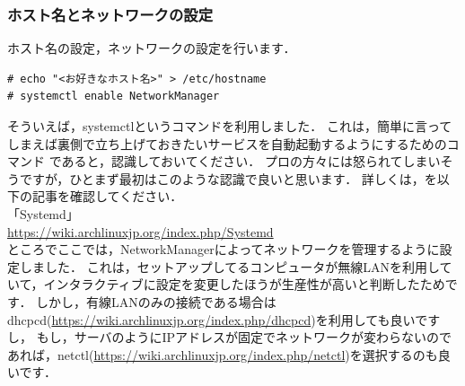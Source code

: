 \documentclass[b5j,twoside,openany]{jsbook}
\begin{document}
      \subsubsection{ホスト名とネットワークの設定}
        ホスト名の設定，ネットワークの設定を行います．
        \begin{screen}
\begin{verbatim}
# echo "<お好きなホスト名>" > /etc/hostname
# systemctl enable NetworkManager
\end{verbatim}
        \end{screen}
        \begin{boxnote}
          そういえば，systemctlというコマンドを利用しました．
          これは，簡単に言ってしまえば裏側で立ち上げておきたいサービスを自動起動するようにするためのコマンド
          であると，認識しておいてください．
          プロの方々には怒られてしまいそうですが，ひとまず最初はこのような認識で良いと思います．
          詳しくは，を以下の記事を確認してください．\\

          「Systemd」\\
          \url{https://wiki.archlinuxjp.org/index.php/Systemd}\\

          ところでここでは，NetworkManagerによってネットワークを管理するように設定しました．
          これは，セットアップしてるコンピュータが無線LANを利用していて，インタラクティブに設定を変更したほうが生産性が高いと判断したためです．
          しかし，有線LANのみの接続である場合はdhcpcd(\url{https://wiki.archlinuxjp.org/index.php/dhcpcd})を利用しても良いですし，
          もし，サーバのようにIPアドレスが固定でネットワークが変わらないのであれば，netctl(\url{https://wiki.archlinuxjp.org/index.php/netctl})を選択するのも良いです．
        \end{boxnote}
\end{document}
